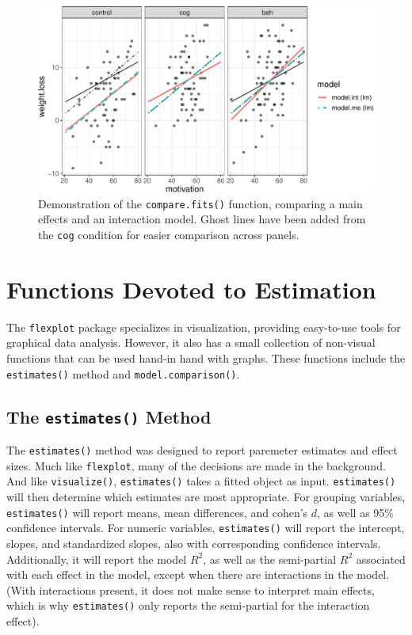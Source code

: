 \documentclass[
  english,
  man]{apa6}
\begin{document}
\begin{figure}
\centering
\includegraphics{flexplot_psychmeth_files/figure-latex/compare-1.pdf}
\caption{\label{fig:compare}Demonstration of the \texttt{compare.fits()} function, comparing a main effects and an interaction model. Ghost lines have been added from the \texttt{cog} condition for easier comparison across panels. \label{fig:compare}}
\end{figure}

\normalsize

\hypertarget{functions-devoted-to-estimation}{%
\section{Functions Devoted to Estimation}\label{functions-devoted-to-estimation}}

The \texttt{flexplot} package specializes in visualization, providing easy-to-use tools for graphical data analysis. However, it also has a small collection of non-visual functions that can be used hand-in hand with graphs. These functions include the \texttt{estimates()} method and \texttt{model.comparison()}.

\hypertarget{the-estimates-method}{%
\subsection{\texorpdfstring{The \texttt{estimates()} Method}{The estimates() Method}}\label{the-estimates-method}}

The \texttt{estimates()} method was designed to report paremeter estimates and effect sizes. Much like \texttt{flexplot}, many of the decisions are made in the background. And like \texttt{visualize()}, \texttt{estimates()} takes a fitted object as input. \texttt{estimates()} will then determine which estimates are most appropriate. For grouping variables, \texttt{estimates()} will report means, mean differences, and cohen's \(d\), as well as 95\% confidence intervals. For numeric variables, \texttt{estimates()} will report the intercept, slopes, and standardized slopes, also with corresponding confidence intervals. Additionally, it will report the model \(R^2\), as well as the semi-partial \(R^2\) associated with each effect in the model, except when there are interactions in the model. (With interactions present, it does not make sense to interpret main effects, which is why \texttt{estimates()} only reports the semi-partial for the interaction effect).
\end{document}

